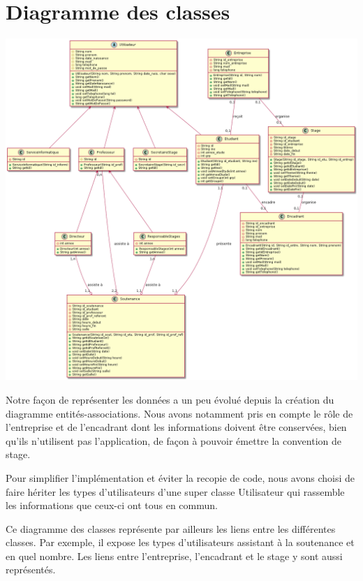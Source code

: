 \documentclass[11pt, a4paper]{report}
\begin{document}
\chapter*{Diagramme des classes}
\centerline{\includegraphics[scale=0.4]{Images/diagrammedesclasses.png}}
\hspace{1cm}Notre façon de représenter les données a un peu évolué depuis la création du diagramme entités-associations. Nous avons notamment pris en compte le rôle de l’entreprise et de l’encadrant dont les informations doivent être conservées, bien qu’ils n’utilisent pas l’application, de façon à pouvoir émettre la convention de stage.\vspace{0.2cm}

\hspace{0.6cm}Pour simplifier l’implémentation et éviter la recopie de code, nous avons choisi de faire hériter les types d’utilisateurs d’une super classe Utilisateur qui rassemble les informations que ceux-ci ont tous en commun.\vspace{0.2cm}

\hspace{0.6cm}Ce diagramme des classes représente par ailleurs les liens entre les différentes classes. Par exemple, il expose les types d’utilisateurs assistant à la soutenance et en quel nombre. Les liens entre l’entreprise, l’encadrant et le stage y sont aussi représentés.\\
\end{document}
